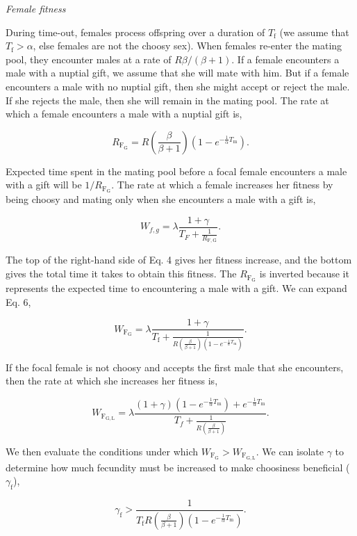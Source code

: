 \documentclass[
]{article}
\begin{document}
\emph{Female fitness}

During time-out, females process offspring over a duration of
\(T_{\mathrm{f}}\) (we assume that \(T_{\mathrm{f}} > \alpha\), else
females are not the choosy sex). When females re-enter the mating pool,
they encounter males at a rate of \(R\beta/(\beta + 1)\). If a female
encounters a male with a nuptial gift, we assume that she will mate with
him. But if a female encounters a male with no nuptial gift, then she
might accept or reject the male. If she rejects the male, then she will
remain in the mating pool. The rate at which a female encounters a male
with a nuptial gift is,

\[R_{\mathrm{F_{G}}} = R \left(\frac{\beta}{\beta + 1}\right)\left(1 - e^{-\frac{1}{\alpha}T_{\mathrm{m}}}\right).\]

Expected time spent in the mating pool before a focal female encounters
a male with a gift will be \(1/R_{\mathrm{F_{G}}}\). The rate at which a
female increases her fitness by being choosy and mating only when she
encounters a male with a gift is,

\[W_{f, g} = \lambda \frac{1 + \gamma}{T_{F} + \frac{1}{R_{\mathrm{F,G}}}}.
\tag{4}
\]

The top of the right-hand side of Eq. 4 gives her fitness increase, and
the bottom gives the total time it takes to obtain this fitness. The
\(R_{\mathrm{F_{G}}}\) is inverted because it represents the expected
time to encountering a male with a gift. We can expand Eq. 6,

\[W_{\mathrm{F_{G}}} = \lambda \frac{1 + \gamma}{T_{\mathrm{f}} + \frac{1}{R \left(\frac{\beta}{\beta + 1}\right)\left(1 - e^{-\frac{1}{\alpha}T_{\mathrm{m}}}\right)}}.\]

If the focal female is not choosy and accepts the first male that she
encounters, then the rate at which she increases her fitness is,

\[W_{\mathrm{F_{G,L}}} = \lambda \frac{\left(1 + \gamma\right)\left(1 - e^{-\frac{1}{\alpha}T_{\mathrm{m}}}\right) + e^{-\frac{1}{\alpha}T_{\mathrm{m}}}}{T_{f} + \frac{1}{R \left(\frac{\beta}{\beta + 1}\right)}}.\]

We then evaluate the conditions under which
\(W_{\mathrm{F_{G}}} > W_{\mathrm{F_{G,L}}}\). We can isolate \(\gamma\)
to determine how much fecundity must be increased to make choosiness
beneficial (\(\gamma_{\mathrm{f}}\)),

\[\gamma_{\mathrm{f}} > \frac{1}{T_{\mathrm{f}} R\left(\frac{\beta}{\beta + 1}\right) \left(1 - e^{-\frac{1}{\alpha}T_{\mathrm{m}}}\right)}.
\tag{5}
\]
\end{document}
